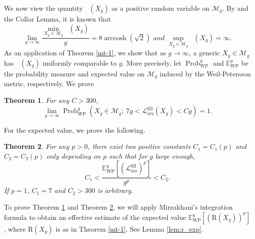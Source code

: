 \documentclass[UTF8]{amsart}
\newtheorem{theorem}{Theorem}[section]
\numberwithin{equation}{section}
\theoremstyle{definition}
\theoremstyle{example}
\theoremstyle{remark}
\DeclareMathOperator{\sys}{sys}
\DeclareMathOperator{\arccosh}{arccosh}
\DeclareMathOperator{\prob}{Prob}
\DeclareMathOperator{\slfs}{\mathcal{L}_{sys}^{fill}}
\newcommand{\sM}{\mathcal{M}}
\begin{document}
We now view the quantity $\slfs(X_g)$ as a positive random variable on $\sM_g$. By \cite{gao2025shortest} and the Collar Lemma, it is known that
\[\lim\limits_{g\to \infty}\frac{\min\limits_{X_g\in \sM_g}\slfs(X_g)}{g}=8\arccosh\left(\sqrt{2}\right) \textit{ and } \sup\limits_{X_g\in \sM_g}\slfs(X_g)=\infty.\]
As an application of Theorem \ref{mt-1}, we show that as $g\to \infty$, a generic $X_g \in \sM_g$ has $\slfs(X_g)$ uniformly comparable to $g$. More precisely, let $\prob_{\mathrm{WP}}^{g}$ and $\mathbb{E}_{\mathrm{WP}}^{g}$ be the probability measure and expected value on $\sM_g$ induced by the Weil-Petersson metric, respectively. We prove
\begin{theorem}
	For any $C > 300$, 
	\[
		\lim_{g\to \infty} \prob_{\mathrm{WP}}^{g}\left(X_g \in \mathcal{M}_g; \ 7g < \mathcal{L}_{\sys}^{\mathrm{fill}}(X_g) < Cg\right) =1.
	\]
	\label{thm:wp_prob}
\end{theorem}
\noindent For the expected value, we prove the following.
\begin{theorem}
	For any $p >0$, there exist two positive constants $C_1 = C_1(p)$ and $C_2 = C_2(p)$ only depending on $p$ such that for $g$ large enough,  
	\[
		C_1 <	\frac{ \mathbb{E}_{\mathrm{WP}}^{g} \left[ (\mathcal{L}_{\sys}^{\mathrm{fill}})^p \right] }{g^p} <C_2. 
	\]
If $p=1$, $C_1 = 7$ and $C_2 > 300$ is arbitrary. 		
	\label{thm:wp_exp}
\end{theorem}
\noindent To prove Theorem \ref{thm:wp_prob} and Theorem \ref{thm:wp_exp}, we will apply Mirzakhani's integration formula \cite[Theorem 7.1]{mirzakhani2007simple} to obtain an effective estimate of the expected value $\mathbb{E}_{\mathrm{WP}}^{g} \left[ (\mathrm{R}(X_g))^p \right]$, where $\mathrm{R}(X_g)$ is as in Theorem \ref{mt-1}. See Lemma \ref{lem:r_exp}.\\
\end{document}
